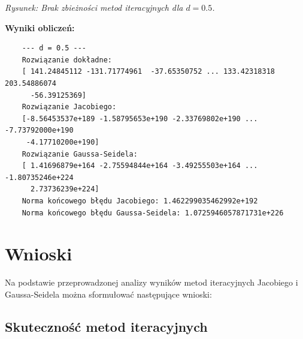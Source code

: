 \documentclass[a4paper,12pt]{article}
\begin{document}
\begin{itemize}
    \noindent{}
    \begin{center}
        \textit{Rysunek: Brak zbieżności metod iteracyjnych dla \(d = 0.5\).}
    \end{center}

    \noindent\textbf{Wyniki obliczeń:}
    \begin{verbatim}
    --- d = 0.5 ---
    Rozwiązanie dokładne:
    [ 141.24845112 -131.71774961  -37.65350752 ... 133.42318318 203.54886074
      -56.39125369]
    Rozwiązanie Jacobiego:
    [-8.56453537e+189 -1.58795653e+190 -2.33769802e+190 ... -7.73792000e+190
     -4.17710200e+190]
    Rozwiązanie Gaussa-Seidela:
    [ 1.41696879e+164 -2.75594844e+164 -3.49255503e+164 ... -1.80735246e+224
      2.73736239e+224]
    Norma końcowego błędu Jacobiego: 1.462299035462992e+192
    Norma końcowego błędu Gaussa-Seidela: 1.0725946057871731e+226
    \end{verbatim}

\end{itemize}




\section{Wnioski}

Na podstawie przeprowadzonej analizy wyników metod iteracyjnych Jacobiego i Gaussa-Seidela można sformułować następujące wnioski:

\subsection{Skuteczność metod iteracyjnych}
\end{document}
